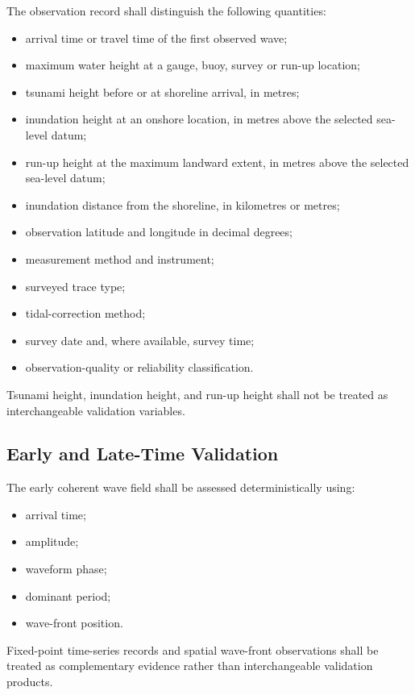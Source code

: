 The observation record shall distinguish the following quantities:
\begin{itemize}
  \item arrival time or travel time of the first observed wave;
  \item maximum water height at a gauge, buoy, survey or run-up
    location;
  \item tsunami height before or at shoreline arrival, in metres;

  \item inundation height at an onshore location, in metres above the selected
    sea-level datum;
  \item run-up height at the maximum landward extent, in metres
    above the selected sea-level datum;
  \item inundation distance from the shoreline,
    in kilometres or metres;
  \item observation latitude and longitude in decimal
    degrees;
  \item measurement method and instrument;
  \item surveyed trace type;

  \item tidal-correction method;
  \item survey date and, where available, survey
    time;
  \item observation-quality or reliability classification.
\end{itemize}
Tsunami height, inundation height, and run-up height shall not be treated as
interchangeable validation variables.

\subsection{Early and Late-Time Validation}
\label{sec:res-dat-obs-timevalidation}

The early coherent wave field shall be assessed deterministically using:

\begin{itemize}
  \item arrival time;
  \item amplitude;
  \item waveform phase;
  \item dominant period;
  \item wave-front position.
\end{itemize}

Fixed-point time-series records and spatial wave-front observations
shall be treated as complementary evidence rather than interchangeable
validation products.

